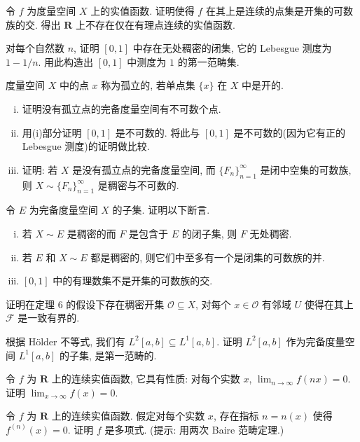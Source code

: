 \documentclass[../../main.tex]{subfiles}
\begin{document}
\begin{exercise}\label{exercise:ch10-21}
令 $f$ 为度量空间 $X$ 上的实值函数. 证明使得 $f$ 在其上是连续的点集是开集的可数族的交. 得出 $\mathbf{R}$ 上不存在仅在有理点连续的实值函数.
\end{exercise}

\begin{exercise}\label{exercise:ch10-22}
对每个自然数 $n$, 证明 $[0,1]$ 中存在无处稠密的闭集, 它的 Lebesgue 测度为 $1-1/n$. 用此构造出 $[0,1]$ 中测度为 $1$ 的第一范畴集.
\end{exercise}

\begin{exercise}\label{exercise:ch10-23}
度量空间 $X$ 中的点 $x$ 称为孤立的, 若单点集 $\{x\}$ 在 $X$ 中是开的.
\begin{enumerate}[(i)]
\item 证明没有孤立点的完备度量空间有不可数个点.
\item 用(i)部分证明 $[0,1]$ 是不可数的. 将此与 $[0,1]$ 是不可数的(因为它有正的 Lebesgue 测度)的证明做比较.
\item 证明: 若 $X$ 是没有孤立点的完备度量空间, 而 $\{F_{n}\}_{n=1}^{\infty}$ 是闭中空集的可数族, 则 $X\sim\{F_{n}\}_{n=1}^{\infty}$ 是稠密与不可数的.
\end{enumerate}
\end{exercise}

\begin{exercise}\label{exercise:ch10-24}
令 $E$ 为完备度量空间 $X$ 的子集. 证明以下断言.
\begin{enumerate}[(i)]
\item 若 $X\sim E$ 是稠密的而 $F$ 是包含于 $E$ 的闭子集, 则 $F$ 无处稠密.
\item 若 $E$ 和 $X\sim E$ 都是稠密的, 则它们中至多有一个是闭集的可数族的并.
\item $[0,1]$ 中的有理数集不是开集的可数族的交.
\end{enumerate}
\end{exercise}

\begin{exercise}\label{exercise:ch10-25}
证明在定理 6 的假设下存在稠密开集 $\mathcal{O}\subseteq X$, 对每个 $x\in\mathcal{O}$ 有邻域 $U$ 使得在其上 $\mathcal{F}$ 是一致有界的.
\end{exercise}

\begin{exercise}\label{exercise:ch10-26}
根据 H\"older 不等式, 我们有 $L^{2}[a,b]\subseteq L^{1}[a,b]$. 证明 $L^{2}[a,b]$ 作为完备度量空间 $L^{1}[a,b]$ 的子集, 是第一范畴的.
\end{exercise}

\begin{exercise}\label{exercise:ch10-27}
令 $f$ 为 $\mathbf{R}$ 上的连续实值函数, 它具有性质: 对每个实数 $x$, $\lim_{n\to\infty}f(nx)=0$. 证明 $\lim_{x\to\infty}f(x)=0$.
\end{exercise}

\begin{exercise}\label{exercise:ch10-28}
令 $f$ 为 $\mathbf{R}$ 上的连续实值函数. 假定对每个实数 $x$, 存在指标 $n=n(x)$ 使得 $f^{(n)}(x)=0$. 证明 $f$ 是多项式. (提示: 用两次 Baire 范畴定理.)
\end{exercise}
\end{document}
